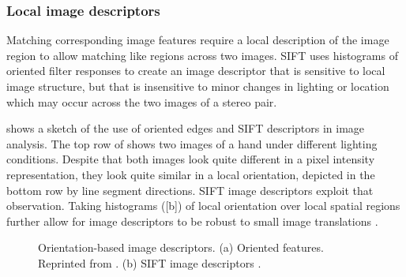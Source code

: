 \subsubsection{Local image descriptors}
Matching corresponding image features require a local description of the image region to allow matching like regions across two images.  SIFT  \cite{Lowe04} uses histograms of oriented filter responses to create an image descriptor that is sensitive to local image structure, but that is insensitive to minor changes in lighting or location which may occur across the two images of a stereo pair.

\Fig{\ref{fig:SIFT}} shows a sketch of the use of oriented edges and SIFT descriptors in image analysis. The top row of  shows two images of a hand under different lighting conditions. Despite that both images look quite different in a pixel intensity representation, they look quite similar in a local orientation, depicted in the bottom row by line segment directions.  SIFT image descriptors \cite{Lowe04} exploit that observation.  Taking histograms (\fig{\ref{fig:SIFT}}[b]) of local orientation over local spatial regions further allow for image descriptors to be robust to small image translations \cite{Freeman98c,Lowe04}.

\begin{figure}[h!]
\centerline{
}
\caption{Orientation-based image descriptors.  (a) Oriented features. Reprinted from \cite{Freeman98c}.  (b) SIFT image descriptors \cite{Lowe04}.}
\label{fig:SIFT}
\end{figure}


